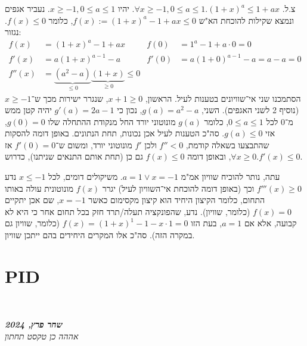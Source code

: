 \documentclass[]{article}
\newcommand\en[1] {\selectlanguage{english}#1\selectlanguage{hebrew}}
\newcommand\ndoc  {\dotfill \\ \vfil {\begin{center} {\textbf{\textit{שחר פרץ, 2024}} \\ \scriptsize \textit{אההה כן טקסט תחתון}} \end{center}} \vfil	}
\begin{document}
	\section{}
	צ.ל. $\forall x \ge -1, 0 \le a \le 1. (1 + x)^{a} \le 1 + ax$. יהיו $x \ge -1, 0 \le a \le 1$. נעביר אגפים ונמצא שקילות להוכחת הא"ש $f(x) := (1 + x)^a - 1 + ax \le 0$, כלומר $f(x) \le 0$. נגזור: 
	\begin{align*}
		f(x) &= (1 + x)^a - 1 + ax & f(0) &= 1^a - 1 + a \cdot 0 = 0 \\
		f'(x) &= a(1 + x)^{a - 1} - a & f'(0) &= a(1 + 0)^{a - 1} - a = a - a = 0 \\
		f''(x) &= \underbrace{(a^2 - a)}_{\le 0}\underbrace{(1 + x)}_{\ge 0} \le 0
	\end{align*}
	הסתמכנו שני אי־שוויונים בטענות לעיל. הראשון, $x + 1 \ge 0$, שנגרר ישירות מכך ש־$x \ge -1$ (נוסיף 2 לשני האגפים). השני, $g(a) = a^2 - a$, נכון כי $g'(a) = 2a - 1 $ יהיה קטן ממש מ־$0$ לכל $0 \le a \le 1$, כלומר $g(a)$ מונוטוני יורד החל מנקודת ההתחלה שלו $g(0) = 0$, אזי $g(a) \le 0$. סה"כ הטענות לעיל אכן נכונות, תחת הנתונים. באופן דומה להסקות שהתבצעו בשאלה קודמת, $f'' < 0 $ ולכן $f'$ מונוטוני יורד, ומשום ש־$f'(0) = 0$ אז $\forall x \ge 0. f'(x) \le 0$, ובאופן דומה $f(x) \le 0$ גם כן (תחת אותם התנאים שניתנו), כדרוש. 
	
	עתה, נותר להוכיח שוויון אמ"מ $a = 1 \lor x = -1$. משיקולים דומים, לכל $x \le -1$ נדע $f'''(x) \ge 0$ וכך (באופן דומה להוכחת אי־השוויון לעיל) יגרר $f(x)$ מונוטונית עולה באותו התחום, כלומר הקיצון היחיד הוא קיצון מקסימום כאשר $x = -1$, שם אכן יתקיים $f(x) = 0$ (כלומר, שוויון). נדע, שהפונקציה תעלה/תרד חזק בכל תחום אחר כי היא לא קבועה, אלא אם $a = 1$, בעת הזו $f(x) = (1 + x)^1 - 1 - x \cdot 1 = 0$ (כלומר, שוויון גם במקרה הזה). סה"כ אלו המקרים היחידים בהם ייתכן שוויון. 
	
	\section{\en{PID}}
	
	
	\ndoc
\end{document}

